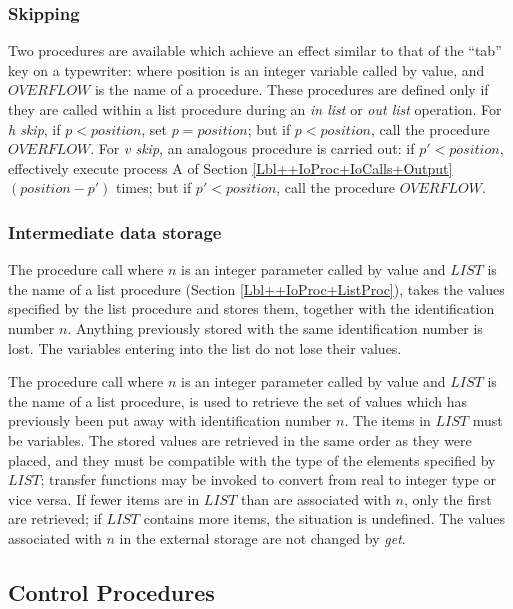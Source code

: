 \documentclass[a4paper,11pt]{article}
\begin{document}
\subsubsection{Skipping}

Two procedures are available which achieve an effect similar to that
of the ``tab'' key on a typewriter:
\noindent{}where position is an integer variable called by value, and
$OVERFLOW$ is the name of a procedure.  These procedures are defined
only if they are called within a list procedure during an {\it in
list} or {\it out list} operation.  For {\it h skip}, if $p <
position$, set $p = position$; but if $p<position$, call the procedure
$OVERFLOW$. For {\it v skip}, an analogous procedure is carried out:
if $p'<position$, effectively execute process A of Section
\ref{Lbl++IoProc+IoCalls+Output} $(position-p')$ times; but if
$p'<position$, call the procedure $OVERFLOW$.

\subsubsection{Intermediate data storage}
The procedure call
\noindent{}where $n$ is an integer parameter called by value and
$LIST$ is the name of a list procedure (Section
\ref{Lbl++IoProc+ListProc}), takes the values specified by the list
procedure and stores them, together with the identification number
$n$.  Anything previously stored with the same identification number
is lost.  The variables entering into the list do not lose their
values.

The procedure call
\noindent{}where $n$ is an integer parameter called by value and $LIST$ is the
name of a list procedure, is used to retrieve the set of values which
has previously been put away with identification number $n$.  The
items in $LIST$ must be variables.  The stored values are retrieved in
the same order as they were placed, and they must be compatible with
the type of the elements specified by $LIST$; transfer functions may
be invoked to convert from real to integer type or vice versa.  If
fewer items are in $LIST$ than are associated with $n$, only the first
are retrieved; if $LIST$ contains more items, the situation is
undefined.  The values associated with $n$ in the external storage are
not changed by {\it get}.

\subsection{Control Procedures}
\label{Lbl++IoProc+ControlProc}
\end{document}

